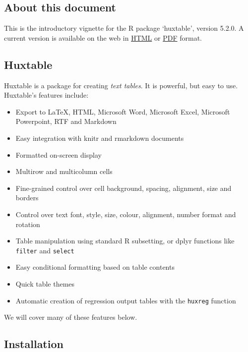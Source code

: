 \documentclass[
]{article}
\providecommand{\tightlist}{%
  \setlength{\itemsep}{0pt}\setlength{\parskip}{0pt}}
\begin{document}
\hypertarget{about-this-document}{%
\subsection{About this document}\label{about-this-document}}

This is the introductory vignette for the R package `huxtable', version
5.2.0. A current version is available on the web in
\href{https://hughjonesd.github.io/huxtable/huxtable.html}{HTML} or
\href{https://hughjonesd.github.io/huxtable/huxtable.pdf}{PDF} format.

\hypertarget{huxtable}{%
\subsection{Huxtable}\label{huxtable}}

Huxtable is a package for creating \emph{text tables}. It is powerful,
but easy to use. Huxtable's features include:

\begin{itemize}
\tightlist
\item
  Export to LaTeX, HTML, Microsoft Word, Microsoft Excel, Microsoft
  Powerpoint, RTF and Markdown
\item
  Easy integration with knitr and rmarkdown documents
\item
  Formatted on-screen display
\item
  Multirow and multicolumn cells
\item
  Fine-grained control over cell background, spacing, alignment, size
  and borders
\item
  Control over text font, style, size, colour, alignment, number format
  and rotation
\item
  Table manipulation using standard R subsetting, or dplyr functions
  like \texttt{filter} and \texttt{select}
\item
  Easy conditional formatting based on table contents
\item
  Quick table themes
\item
  Automatic creation of regression output tables with the
  \texttt{huxreg} function
\end{itemize}

We will cover many of these features below.

\hypertarget{installation}{%
\subsection{Installation}\label{installation}}
\end{document}
